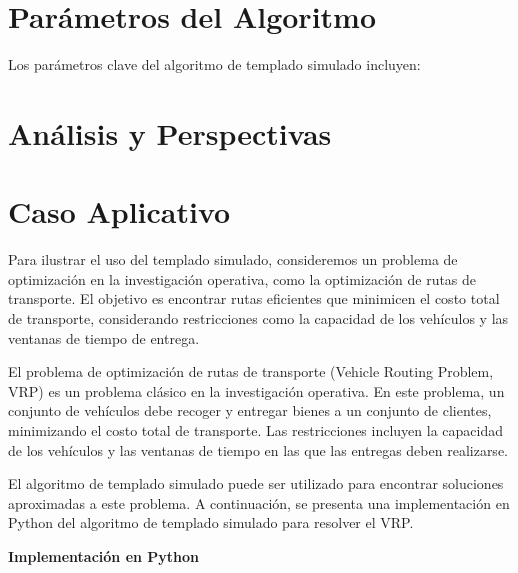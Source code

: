 \documentclass{article}
\begin{document}
\section{Parámetros del Algoritmo}
Los parámetros clave del algoritmo de templado simulado incluyen:

\section{Análisis y Perspectivas}


\section{Caso Aplicativo}
Para ilustrar el uso del templado simulado, consideremos un problema de optimización en la investigación operativa, como la optimización de rutas de transporte. El objetivo es encontrar rutas eficientes que minimicen el costo total de transporte, considerando restricciones como la capacidad de los vehículos y las ventanas de tiempo de entrega.

El problema de optimización de rutas de transporte (Vehicle Routing Problem, VRP) es un problema clásico en la investigación operativa. En este problema, un conjunto de vehículos debe recoger y entregar bienes a un conjunto de clientes, minimizando el costo total de transporte. Las restricciones incluyen la capacidad de los vehículos y las ventanas de tiempo en las que las entregas deben realizarse.

El algoritmo de templado simulado puede ser utilizado para encontrar soluciones aproximadas a este problema. A continuación, se presenta una implementación en Python del algoritmo de templado simulado para resolver el VRP.

\textbf{Implementación en Python}

\end{document}
